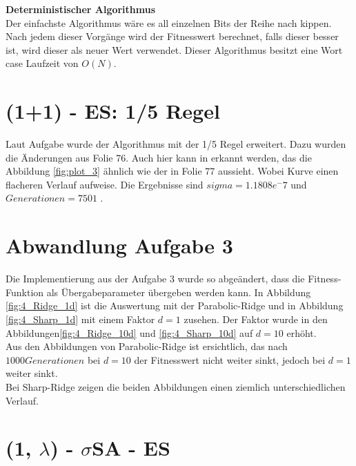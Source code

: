 \textbf{Deterministischer Algorithmus}\\

Der einfachste Algorithmus wäre es all einzelnen Bits der Reihe nach kippen. Nach jedem dieser Vorgänge wird der Fitnesswert berechnet, falls dieser besser ist, wird dieser als neuer Wert verwendet. Dieser Algorithmus besitzt eine Wort case Laufzeit von $O(N)$.

\chapter{(1+1) - ES: 1/5 Regel}

Laut Aufgabe wurde der Algorithmus mit der 1/5 Regel erweitert. Dazu wurden die Änderungen aus Folie 76. Auch hier kann in erkannt werden, das die Abbildung \ref{fig:plot_3} ähnlich wie der in Folie 77 aussieht. Wobei Kurve einen flacheren Verlauf aufweise. Die Ergebnisse sind $sigma = 1.1808e^-7$ und $Generationen = 7501$ .


\chapter{Abwandlung Aufgabe 3}

Die Implementierung aus der Aufgabe 3 wurde so abgeändert, dass die Fitness-Funktion als Übergabeparameter übergeben werden kann. In Abbildung \ref{fig:4_Ridge_1d} ist die Auswertung mit der Parabolic-Ridge und in Abbildung \ref{fig:4_Sharp_1d} mit einem Faktor $d=1$ zusehen. Der Faktor wurde in den Abbildungen\ref{fig:4_Ridge_10d} und \ref{fig:4_Sharp_10d} auf $d=10$ erhöht.\\
Aus den Abbildungen von Parabolic-Ridge ist ersichtlich, das nach $1000 Generationen$ bei $d = 10$ der Fitnesswert nicht weiter sinkt, jedoch bei $d = 1$ weiter sinkt.\\
Bei Sharp-Ridge zeigen die beiden Abbildungen einen ziemlich unterschiedlichen Verlauf.


\chapter{(1, $\lambda$) - $\sigma$SA - ES}

